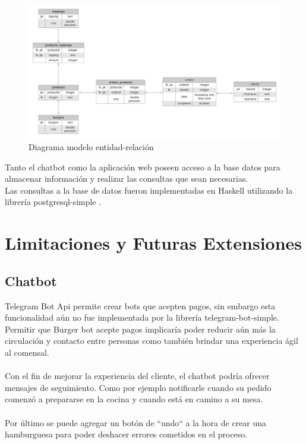 \documentclass[a4paper,12pt]{article}
\begin{document}
\begin{figure}[H]
	\centering
	\includegraphics[width=1.0\linewidth]{diagrama-er.jpeg}
	\caption{Diagrama modelo entidad-relación}
	\label{fig:Diagrama de er}
\end{figure}

Tanto el chatbot como la aplicación web poseen acceso a la base datos para almacenar información y realizar las consultas que sean necesarias. 
\\
Las consultas a la base de datos fueron implementadas en Haskell utilizando la librería postgresql-simple \cite{postgresql-simple}.

\pagebreak

\section{Limitaciones y Futuras Extensiones}

\subsection{Chatbot}

Telegram Bot Api permite crear bots que acepten pagos, sin embargo esta funcionalidad aún no fue implementada por la librería telegram-bot-simple. Permitir que Burger bot acepte pagos implicaría poder reducir aún más la circulación y contacto entre personas como también brindar una experiencia ágil al comensal.
\\\\
Con el fin de mejorar la experiencia del cliente, el chatbot podría ofrecer mensajes de seguimiento. Como por ejemplo notificarle cuando su pedido comenzó a prepararse en la cocina y cuando está en camino a su mesa.
\\\\
Por último se puede agregar un botón de “undo“ a la hora de crear una hamburguesa para poder deshacer errores cometidos en el proceso.
\end{document}
